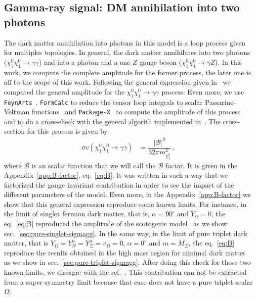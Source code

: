 \documentclass[12pt,letterpaper]{article}
\begin{document}
\subsection{Gamma-ray signal: DM annihilation into two photons}
\label{sec:gamma-ray}
  
The dark matter annihilation into photons in this model is a loop process given for multiples topologies. In general, the dark matter annihilates into two photons ($\chi_1^0\chi_1^0\rightarrow\gamma\gamma$) and into a photon and a one $Z$ gauge boson ($\chi_1^0\chi_1^0\rightarrow\gamma Z$). In this work, we compute the complete amplitude for the former process, the later one is off to the scope of this work.
%
Following the general expression given in~\cite{Garcia-Cely:2016hsk} we computed the general amplitude for the $\chi_1^0\chi_1^0\rightarrow\gamma\gamma$ process. Even more, we use \texttt{FeynArts}~\cite{Hahn:2000kx}, \texttt{FormCalc} to reduce the tensor loop integrals to scalar Passarino--Veltman functions~\cite{Passarino:1978jh} and \texttt{Package-X}~\cite{Patel:2015tea} to compute the amplitude of this process and to do a cross-check with the general algorith implemented in~\cite{Garcia-Cely:2016hsk}.
%
The cross-section for this process is given by
%
\begin{align}
\label{eq:sigmav-gg}
\sigma v (\chi_1^0\chi_1^0\rightarrow\gamma\gamma) &= \dfrac{|\mathcal{B}|^2}{32\pi m_{\chi_1^0}^2}\,,
\end{align}
%
where $\mathcal{B}$ is an scalar function that we will call the $\mathcal{B}$ factor. It is given in the Appendix~\ref{app:B-factor}, eq.~\ref{eq:B}. It was written in such a way that we factorized the gauge invariant contribution in order to see the impact of the different parameters of the model.
Even more, in the Appendix~\ref{app:B-factor} we show that this general expression reproduce some known limits. For instance, in the limit of singlet fermion dark matter, that is, $\alpha =90^{\circ}$ and $Y_{\Omega}=0$, the eq.~\ref{eq:B} reproduced the amplitude of the scotogenic model~\cite{Garny:2015wea,Garcia-Cely:2016hsk} as we show sec.~\ref{sec:pure-singlet-sigmagg}.
In the same way, in the limit of pure triplet dark matter, that is $Y_{\Omega}=Y_{N}^{\alpha}=Y_{\Sigma}^{\alpha}=v_{\Omega}=0$, $\alpha =0^{\circ}$ and $m=M_{\Sigma}$,  the eq.~\ref{eq:B} reproduce the results obtained in the high mass region for minimal dark matter~\cite{Cirelli:2005uq} as we show in sec.~\ref{sec:pure-triplet-sigmagg}.
After doing this check for those two known limits, we dissagre with the ref.~\cite{Choubey:2017yyn}. This contribution can not be extracted from a super-symmetry limit because that case does not have a pure triplet scalar $\Omega$.
\end{document}
